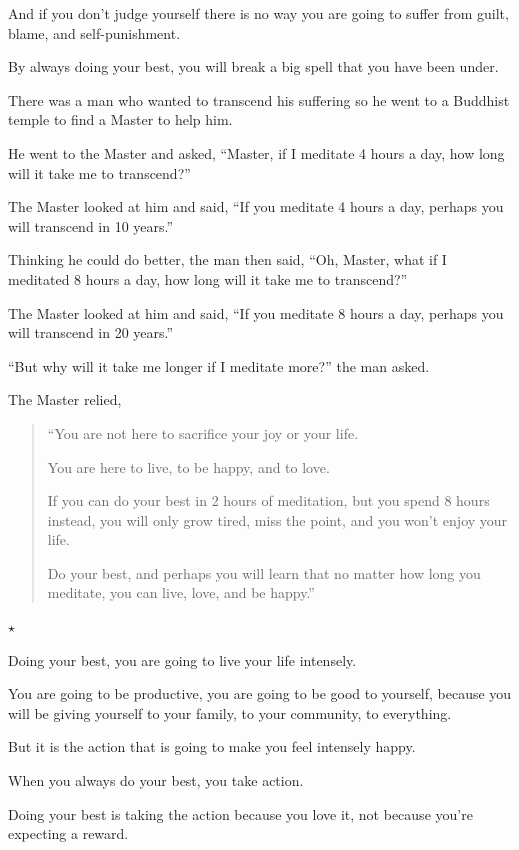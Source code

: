 \documentclass{article}
\numberwithin{equation}{section}
\begin{document}
And if you don't judge yourself there is no way you are going to suffer from guilt, blame, and self-punishment.

By always doing your best, you will break a big spell that you have been under.

%
There was a man who wanted to transcend his suffering so he went to a Buddhist temple to find a Master to help him.

He went to the Master and asked, ``Master, if I meditate 4 hours a day, how long will it take me to transcend?''

%
The Master looked at him and said, ``If you meditate 4 hours a day, perhaps you will transcend in 10 years.''

%
Thinking he could do better, the man then said, ``Oh, Master, what if I meditated 8 hours a day, how long will it take me to transcend?''

%
The Master looked at him and said, ``If you meditate 8 hours a day, perhaps you will transcend in 20 years.''

%
``But why will it take me longer if I meditate more?'' the man asked.

%
The Master relied,
\begin{quotation}
    ``You are not here to sacrifice your joy or your life.
    
    You are here to live, to be happy, and to love.
    
    If you can do your best in 2 hours of meditation, but you spend 8 hours instead, you will only grow tired, miss the point, and you won't enjoy your life.
    
    Do your best, and perhaps you will learn that no matter how long you meditate, you can live, love, and be happy.''
\end{quotation}

\begin{center}
    $\star$
\end{center}

Doing your best, you are going to live your life intensely.

You are going to be productive, you are going to be good to yourself, because you will be giving yourself to your family, to your community, to everything.

But it is the action that is going to make you feel intensely happy.

When you always do your best, you take action.

Doing your best is taking the action because you love it, not because you're expecting a reward.
\end{document}
